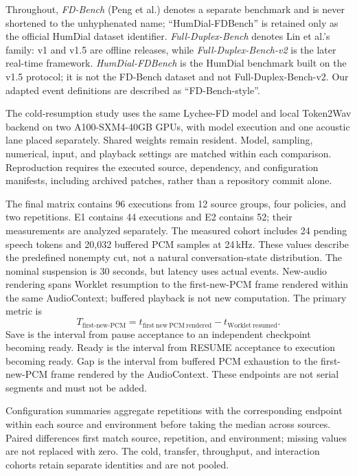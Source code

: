 Throughout, \emph{FD-Bench} (Peng et al.) denotes a separate benchmark and
is never shortened to the unhyphenated name; ``HumDial-FDBench'' is retained
only as the official HumDial dataset identifier. \emph{Full-Duplex-Bench} denotes Lin et
al.'s family: v1 and v1.5 are offline releases, while
\emph{Full-Duplex-Bench-v2} is the later real-time framework. \emph{HumDial-FDBench}
is the HumDial benchmark built on the v1.5 protocol; it is not the FD-Bench
dataset and not Full-Duplex-Bench-v2. Our adapted event definitions are
described as ``FD-Bench-style''.


The cold-resumption study uses the same Lychee-FD model and local
Token2Wav backend \citep{lychee2026} on two A100-SXM4-40GB GPUs,
with model execution and one acoustic lane placed separately.
Shared weights remain resident.
Model, sampling, numerical, input, and playback settings are matched
within each comparison. Reproduction requires the executed source,
dependency, and configuration manifests, including archived patches,
rather than a repository commit alone.

The final matrix contains 96 executions from 12 source groups,
four policies, and two repetitions. E1 contains 44 executions and
E2 contains 52; their measurements are analyzed separately.
The measured cohort includes 24 pending speech tokens and
20,032 buffered PCM samples at 24\,kHz. These values describe the
predefined nonempty cut, not a natural conversation-state distribution.
The nominal suspension is 30 seconds, but latency uses actual events.
New-audio rendering spans Worklet resumption to the first-new-PCM frame
rendered within the same AudioContext; buffered
playback is not new computation. The primary metric is
\[
T_{\mathrm{first\text{-}new\text{-}PCM}}
=t_{\mathrm{first\ new\ PCM\ rendered}}
-t_{\mathrm{Worklet\ resumed}}.
\]
Save is the interval from pause acceptance to an independent checkpoint
becoming ready. Ready is the interval from RESUME acceptance to execution
becoming ready. Gap is the interval from buffered PCM exhaustion to the
first-new-PCM frame rendered by the AudioContext.
These endpoints are not serial segments and must not be added.

Configuration summaries aggregate repetitions with the corresponding
endpoint within each source and environment before taking the median
across sources. Paired differences first match source, repetition, and
environment; missing values are not replaced with zero. The cold,
transfer, throughput, and interaction cohorts retain separate identities
and are not pooled.


